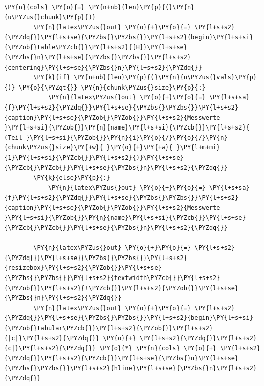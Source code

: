 \begin{tcolorbox}[breakable, size=fbox, boxrule=1pt, pad at break*=1mm,colback=cellbackground, colframe=cellborder]
\begin{Verbatim}[commandchars=\\\{\}]
        \PY{n}{cols} \PY{o}{=} \PY{n+nb}{len}\PY{p}{(}\PY{n}{u\PYZus{}chunk}\PY{p}{)}
        \PY{n}{latex\PYZus{}out} \PY{o}{+}\PY{o}{=} \PY{l+s+s2}{\PYZdq{}}\PY{l+s+se}{\PYZbs{}\PYZbs{}}\PY{l+s+s2}{begin}\PY{l+s+si}{\PYZob{}table\PYZcb{}}\PY{l+s+s2}{[H]}\PY{l+s+se}{\PYZbs{}n}\PY{l+s+se}{\PYZbs{}\PYZbs{}}\PY{l+s+s2}{centering}\PY{l+s+se}{\PYZbs{}n}\PY{l+s+s2}{\PYZdq{}}
        \PY{k}{if} \PY{n+nb}{len}\PY{p}{(}\PY{n}{u\PYZus{}vals}\PY{p}{)} \PY{o}{\PYZgt{}} \PY{n}{chunk\PYZus{}size}\PY{p}{:}
            \PY{n}{latex\PYZus{}out} \PY{o}{+}\PY{o}{=} \PY{l+s+sa}{f}\PY{l+s+s2}{\PYZdq{}}\PY{l+s+se}{\PYZbs{}\PYZbs{}}\PY{l+s+s2}{caption}\PY{l+s+se}{\PYZob{}\PYZob{}}\PY{l+s+s2}{Messwerte }\PY{l+s+si}{\PYZob{}}\PY{n}{name}\PY{l+s+si}{\PYZcb{}}\PY{l+s+s2}{ (Teil }\PY{l+s+si}{\PYZob{}}\PY{n}{i}\PY{o}{/}\PY{o}{/}\PY{n}{chunk\PYZus{}size}\PY{+w}{ }\PY{o}{+}\PY{+w}{ }\PY{l+m+mi}{1}\PY{l+s+si}{\PYZcb{}}\PY{l+s+s2}{)}\PY{l+s+se}{\PYZcb{}\PYZcb{}}\PY{l+s+se}{\PYZbs{}n}\PY{l+s+s2}{\PYZdq{}}
        \PY{k}{else}\PY{p}{:}
            \PY{n}{latex\PYZus{}out} \PY{o}{+}\PY{o}{=} \PY{l+s+sa}{f}\PY{l+s+s2}{\PYZdq{}}\PY{l+s+se}{\PYZbs{}\PYZbs{}}\PY{l+s+s2}{caption}\PY{l+s+se}{\PYZob{}\PYZob{}}\PY{l+s+s2}{Messwerte }\PY{l+s+si}{\PYZob{}}\PY{n}{name}\PY{l+s+si}{\PYZcb{}}\PY{l+s+se}{\PYZcb{}\PYZcb{}}\PY{l+s+se}{\PYZbs{}n}\PY{l+s+s2}{\PYZdq{}}
            
        \PY{n}{latex\PYZus{}out} \PY{o}{+}\PY{o}{=} \PY{l+s+s2}{\PYZdq{}}\PY{l+s+se}{\PYZbs{}\PYZbs{}}\PY{l+s+s2}{resizebox}\PY{l+s+s2}{\PYZob{}}\PY{l+s+se}{\PYZbs{}\PYZbs{}}\PY{l+s+s2}{textwidth\PYZcb{}}\PY{l+s+s2}{\PYZob{}}\PY{l+s+s2}{!\PYZcb{}}\PY{l+s+s2}{\PYZob{}}\PY{l+s+se}{\PYZbs{}n}\PY{l+s+s2}{\PYZdq{}}
        \PY{n}{latex\PYZus{}out} \PY{o}{+}\PY{o}{=} \PY{l+s+s2}{\PYZdq{}}\PY{l+s+se}{\PYZbs{}\PYZbs{}}\PY{l+s+s2}{begin}\PY{l+s+si}{\PYZob{}tabular\PYZcb{}}\PY{l+s+s2}{\PYZob{}}\PY{l+s+s2}{|c|}\PY{l+s+s2}{\PYZdq{}} \PY{o}{+} \PY{l+s+s2}{\PYZdq{}}\PY{l+s+s2}{c|}\PY{l+s+s2}{\PYZdq{}} \PY{o}{*} \PY{n}{cols} \PY{o}{+} \PY{l+s+s2}{\PYZdq{}}\PY{l+s+s2}{\PYZcb{}}\PY{l+s+se}{\PYZbs{}n}\PY{l+s+se}{\PYZbs{}\PYZbs{}}\PY{l+s+s2}{hline}\PY{l+s+se}{\PYZbs{}n}\PY{l+s+s2}{\PYZdq{}}
        

\end{Verbatim}
\end{tcolorbox}
